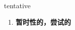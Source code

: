 
\begin{frame}
{\huge tentative}
\begin{center}
\begin{enumerate}\Large
  \item \textbf{暂时性的，尝试的}
\end{enumerate}
\end{center}
\end{frame}
